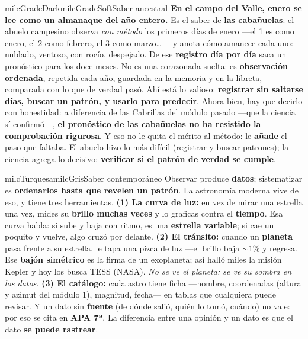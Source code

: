\documentclass[11pt,letterpaper]{article}
\begin{document}
\begin{softbox}{milcGradeDark}{milcGradeSoft}{Saber ancestral}
\textbf{En el campo del Valle, enero se lee como un almanaque del año entero.} Es el saber de \textbf{las cabañuelas}: el abuelo campesino observa \emph{con método} los primeros días de enero ---el 1 es como enero, el 2 como febrero, el 3 como marzo\ldots--- y anota cómo amanece cada uno: nublado, ventoso, con rocío, despejado. De ese \textbf{registro día por día} saca un pronóstico para los doce meses. No es una corazonada suelta: es \textbf{observación ordenada}, repetida cada año, guardada en la memoria y en la libreta, comparada con lo que de verdad pasó. Ahí está lo valioso: \textbf{registrar sin saltarse días, buscar un patrón, y usarlo para predecir}. Ahora bien, hay que decirlo con honestidad: a diferencia de las Cabrillas del módulo pasado ---que la ciencia sí confirmó---, \textbf{el pronóstico de las cabañuelas no ha resistido la comprobación rigurosa}. Y eso no le quita el mérito al método: le \textbf{añade} el paso que faltaba. El abuelo hizo lo más difícil (registrar y buscar patrones); la ciencia agrega lo decisivo: \textbf{verificar si el patrón de verdad se cumple}.
\end{softbox}

\begin{softbox}{milcTurquesa}{milcGris}{Saber contemporáneo}
Observar produce \textbf{datos}; sistematizar es \textbf{ordenarlos hasta que revelen un patrón}. La astronomía moderna vive de eso, y tiene tres herramientas. \textbf{(1) La curva de luz:} en vez de mirar una estrella una vez, mides su \textbf{brillo muchas veces} y lo graficas contra el \textbf{tiempo}. Esa curva habla: si sube y baja con ritmo, es una \textbf{estrella variable}; si cae un poquito y vuelve, algo cruzó por delante. \textbf{(2) El tránsito:} cuando un \textbf{planeta} pasa frente a su estrella, le tapa una pizca de luz ---el brillo baja $\sim 1\%$ y regresa. Ese \textbf{bajón simétrico} es la firma de un exoplaneta; así halló miles la misión Kepler y hoy los busca TESS (NASA). \emph{No se ve el planeta: se ve su sombra en los datos.} \textbf{(3) El catálogo:} cada astro tiene ficha ---nombre, coordenadas (altura y azimut del módulo 1), magnitud, fecha--- en tablas que cualquiera puede revisar. Y un dato sin \textbf{fuente} (de dónde salió, quién lo tomó, cuándo) no vale: por eso se cita en \textbf{APA 7ª}. La diferencia entre una opinión y un dato es que el dato \textbf{se puede rastrear}.
\end{softbox}
\end{document}
